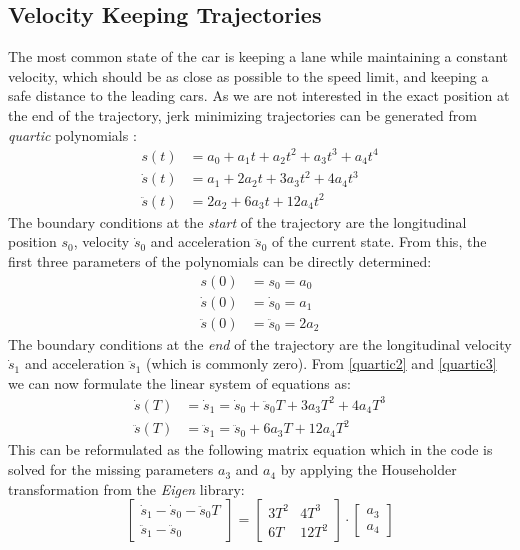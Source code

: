 \documentclass[twoside]{article}
\begin{document}
\subsection{Velocity Keeping Trajectories}
The most common state of the car is keeping a lane while maintaining a constant velocity, which
should be as close as possible to the speed limit, and keeping a safe distance to the leading
cars. As we are not interested in the exact position at the end of the trajectory, jerk minimizing
trajectories can be generated from \emph{quartic} polynomials \cite{werling2010optimal}:
\begin{align}
s(t) &= a_0 + a_1 t + a_2 t^2 + a_3 t^3 + a_4 t^4\\
\dot{s}(t) &= a_1 + 2 a_2 t + 3 a_3 t^2 + 4 a_4 t^3 \label{quartic2}\\
\ddot{s}(t) &= 2 a_2 + 6 a_3 t + 12 a_4 t^2 \label{quartic3}
\end{align}
The boundary conditions at the \emph{start} of the trajectory are the longitudinal position $s_0$,
velocity $\dot s_0$ and acceleration $\ddot s_0$ of the current state.
From this, the first three parameters of the polynomials can be directly determined:
\begin{align}
s(0) &= s_0 = a_0\\
\dot s(0) &= \dot s_0 = a_1\\
\ddot s(0) &= \ddot s_0 = 2 a_2
\end{align}
The boundary conditions at the \emph{end} of the trajectory are the longitudinal velocity $\dot s_1$
and acceleration $\ddot s_1$ (which is commonly zero). From \eqref{quartic2} and \eqref{quartic3}
we can now formulate the linear system of equations as:
\begin{align}
\dot s(T) &= \dot s_1 = \dot s_0 + \ddot s_0 T + 3 a_3 T^2 + 4 a_4 T^3\\
\ddot s(T) &= \ddot s_1 = \ddot s_0 + 6 a_3 T + 12 a_4 T^2
\end{align}
This can be reformulated as the following matrix equation which in the code is solved for the
missing parameters $a_3$ and $a_4$ by applying the Householder transformation from the \emph{Eigen}
library:
\begin{equation}
  \begin{bmatrix}
    \dot s_1 - \dot s_0 - \ddot s_0 T \\
    \ddot s_1 - \ddot s_0
  \end{bmatrix}
=
\begin{bmatrix}
3 T^2 & 4 T^3 \\
6 T & 12 T^2
\end{bmatrix}
\cdot
\begin{bmatrix}
  a_3 \\ a_4
\end{bmatrix}
\label{quartic_matrix}
\end{equation}
\end{document}
